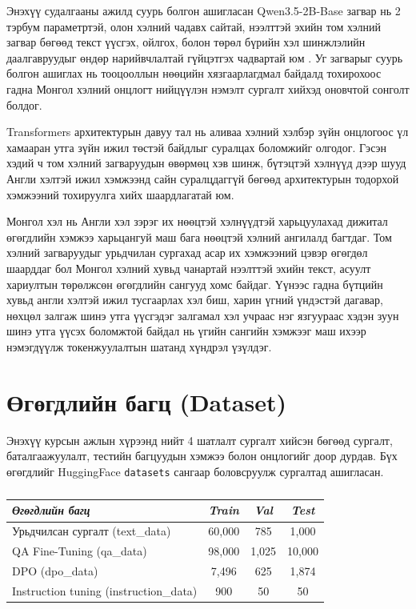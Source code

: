 \documentclass[a4paper,10pt,twocolumn]{article}
\begin{document}
	Энэхүү судалгааны ажилд суурь болгон ашигласан Qwen3.5-2B-Base загвар нь 2 тэрбум параметртэй, олон хэлний чадавх сайтай, нээлттэй эхийн том хэлний загвар бөгөөд текст үүсгэх, ойлгох, болон төрөл бүрийн хэл шинжлэлийн даалгавруудыг өндөр нарийвчлалтай гүйцэтгэх чадвартай юм \cite{qwen}. Уг загварыг суурь болгон ашиглах нь тооцооллын нөөцийн хязгаарлагдмал байдалд тохирохоос гадна Монгол хэлний онцлогт нийцүүлэн нэмэлт сургалт хийхэд оновчтой сонголт болдог.
	
	Transformers архитектурын давуу тал нь аливаа хэлний хэлбэр зүйн онцлогоос үл хамааран утга зүйн ижил төстэй байдлыг суралцах боломжийг олгодог. Гэсэн хэдий ч том хэлний загваруудын өвөрмөц хэв шинж, бүтэцтэй хэлнүүд дээр шууд Англи хэлтэй ижил хэмжээнд сайн суралцдаггүй бөгөөд архитектурын тодорхой хэмжээний тохируулга хийх шаардлагатай юм. 
	
	Монгол хэл нь Англи хэл зэрэг их нөөцтэй хэлнүүдтэй харьцуулахад дижитал өгөгдлийн хэмжээ харьцангуй маш бага нөөцтэй хэлний ангилалд багтдаг. Том хэлний загваруудыг урьдчилан сургахад асар их хэмжээний цэвэр өгөгдөл шаарддаг бол Монгол хэлний хувьд чанартай нээлттэй эхийн текст, асуулт хариултын төрөлжсөн өгөгдлийн сангууд хомс байдаг. Үүнээс гадна бүтцийн хувьд англи хэлтэй ижил тусгаарлах хэл биш, харин үгний үндэстэй дагавар, нөхцөл залгаж шинэ утга үүсгэдэг залгамал хэл учраас нэг язгуураас хэдэн зуун шинэ утга үүсэх боломжтой байдал нь үгийн сангийн хэмжээг маш ихээр нэмэгдүүлж токенжуулалтын шатанд хүндрэл үзүлдэг. 
	
	\section{Өгөгдлийн багц (Dataset)}
	
	Энэхүү курсын ажлын хүрээнд нийт 4 шатлалт сургалт хийсэн бөгөөд сургалт, баталгаажуулалт, тестийн багцуудын хэмжээ болон онцлогийг доор дурдав. Бүх өгөгдлийг HuggingFace \texttt{datasets} сангаар боловсруулж сургалтад ашигласан.
	
	\begin{table}[H]
		\centering
		\fontsize{8pt}{10pt}\selectfont
		\renewcommand{\arraystretch}{1.2} 
		
		\caption{}
		\vspace{-4pt}
		
		\begin{tabularx}{\linewidth}{>{\raggedright\arraybackslash}X c c c}
			\toprule
			\textbf{\textit{Өгөгдлийн багц}} & \textbf{\textit{Train}} & \textbf{\textit{Val}} & \textbf{\textit{Test}} \\
			\midrule
			Урьдчилсан сургалт (text\_data) & 60,000 & 785 & 1,000 \\
			QA Fine-Tuning (qa\_data) & 98,000 & 1,025 & 10,000 \\
			DPO (dpo\_data) & 7,496 & 625 & 1,874 \\
			Instruction tuning (instruction\_data) & 900 & 50 & 50 \\
			\bottomrule
		\end{tabularx}
		\label{table1}
	\end{table}
	
\end{document}
